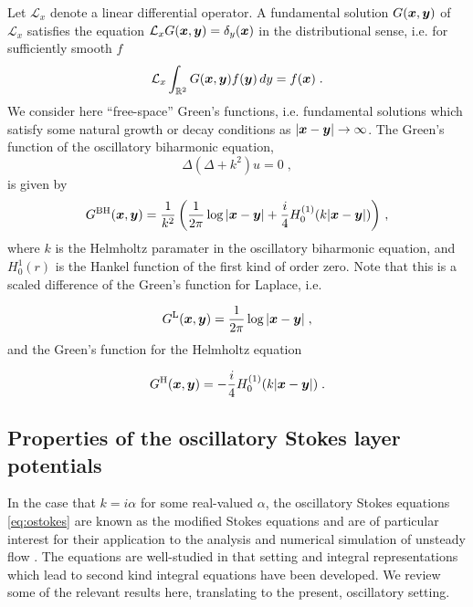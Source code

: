 Let $\mathcal{L}_x$ denote a linear differential operator. A fundamental
solution $G({\boldsymbol x},{\boldsymbol y})$ of $\mathcal{L}_x$ satisfies the equation
$\mathcal{L}_x G({\boldsymbol x},{\boldsymbol y}) = \delta_y({\boldsymbol x})$ in the distributional sense, i.e.
for sufficiently smooth $f$
\begin{equation}
  \mathcal{L}_x \int_{\mathbb{R}^2} G({\boldsymbol x},{\boldsymbol y}) f({\boldsymbol y}) \, dy = f({\boldsymbol x}) \; .
  \nonumber
\end{equation}
We consider here
``free-space'' Green's functions, i.e. fundamental solutions which satisfy
some natural growth or decay conditions as $|{\boldsymbol x}-{\boldsymbol y}| \to \infty$.
The Green's function of the oscillatory biharmonic equation,
\begin{equation}
  \Delta ( \Delta + k^2 ) u = 0 \; , \label{eq:obiharm} \nonumber
\end{equation}
is given by 
\begin{equation}
  G^{\textrm{BH}}({\boldsymbol x},{\boldsymbol y}) = \frac{1}{k^2}
  \left (\frac{1}{2\pi} \log |{\boldsymbol x}-{\boldsymbol y}| +
  \frac{i}{4} H_0^{(1)}(k|{\boldsymbol x}-{\boldsymbol y}|) \right ) \, ,
  \label{eq:Gbh}
\end{equation}
where $k$ is the Helmholtz paramater in the oscillatory biharmonic equation,
and $H_{0}^{1}(r)$ is the Hankel function of the first kind of order zero.
Note that this is a scaled difference of the Green's function for
Laplace, i.e.

\begin{equation}
  G^{\textrm{L}}({\boldsymbol x},{\boldsymbol y}) = \frac{1}{2\pi} \log |{\boldsymbol x}-{\boldsymbol y}| \; , \nonumber
\end{equation}
and the Green's function for the Helmholtz equation

\begin{equation}
  G^{\textrm{H}}({\boldsymbol x},{\boldsymbol y}) = -\frac{i}{4} H_0^{(1)}(k|{\boldsymbol x}-{\boldsymbol y}|) \; . \nonumber
\end{equation}

\subsection{Properties of the oscillatory Stokes layer
  potentials}

In the case that $k=i\alpha$ for some real-valued $\alpha$,
the oscillatory Stokes equations \cref{eq:ostokes}
are known as the modified Stokes equations and are of particular
interest for their application to the analysis and numerical
simulation of unsteady flow
\cite{pozrikidis1992boundary,biros2002embedded,
  jiang2013second,ladyzhenskaya1969mathematical}.
The equations are well-studied in that setting and
integral representations which lead to second kind
integral equations have been developed. We review
some of the relevant results here, translating to
the present, oscillatory setting.

